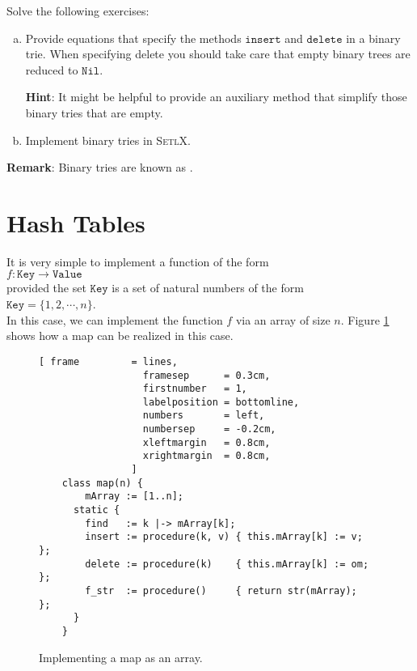 Solve the following exercises:
\begin{enumerate}[(a)]
\item Provide equations that specify the methods $\mathtt{insert}$ and $\mathtt{delete}$ in a binary trie.
      When specifying delete you should take care that empty binary trees are reduced to
      $\mathtt{Nil}$.

      \textbf{Hint}:  It might be helpful to provide an auxiliary method that simplify those binary
      tries that are empty.
\item Implement binary tries in \textsc{SetlX}.
\end{enumerate}
\textbf{Remark}: Binary tries are known as .  \eox

\section{Hash Tables}
It is very simple to implement a function of the form \\[0.2cm]
\hspace*{1.3cm} $f: \mathtt{Key} \rightarrow \mathtt{Value}$ \\[0.2cm]
provided the set $\mathtt{Key}$ is a set of natural numbers of the form  \\[0.2cm]
\hspace*{1.3cm} $\mathtt{Key} = \{ 1, 2, \cdots, n \}$. \\[0.2cm]
In this case, we can implement the function $f$ via an array of size $n$.
Figure \ref{fig:map-array.stlx} shows how a map can be realized in this case.

\begin{figure}[!ht]
\centering
\begin{Verbatim}[ frame         = lines, 
                  framesep      = 0.3cm, 
                  firstnumber   = 1,
                  labelposition = bottomline,
                  numbers       = left,
                  numbersep     = -0.2cm,
                  xleftmargin   = 0.8cm,
                  xrightmargin  = 0.8cm,
                ]
    class map(n) {
        mArray := [1..n];
      static {
        find   := k |-> mArray[k];
        insert := procedure(k, v) { this.mArray[k] := v;  };
        delete := procedure(k)    { this.mArray[k] := om; };
        f_str  := procedure()     { return str(mArray);   };
      }
    }
\end{Verbatim}
\vspace*{-0.3cm}
\caption{Implementing a map as an array.}
\label{fig:map-array.stlx}
\end{figure}




